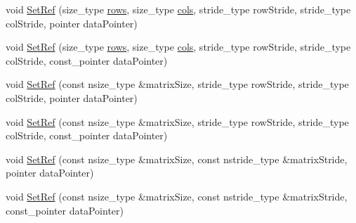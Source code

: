 {\bf }\par
\begin{DoxyCompactItemize}
\item 
void \hyperlink{classvct_dynamic_const_matrix_ref_a5f4c43a9600e4cf979d3daf0a466443a}{Set\-Ref} (size\-\_\-type \hyperlink{classvct_dynamic_const_matrix_base_a5eac13be2207ebeb8766cde379d73438}{rows}, size\-\_\-type \hyperlink{classvct_dynamic_const_matrix_base_aa6c51d41a100da49a7e7ac7edb20ecd9}{cols}, stride\-\_\-type row\-Stride, stride\-\_\-type col\-Stride, pointer data\-Pointer)
\item 
void \hyperlink{classvct_dynamic_const_matrix_ref_ac5ecb9f96a3cfc67d87ca1c7ddd0ed43}{Set\-Ref} (size\-\_\-type \hyperlink{classvct_dynamic_const_matrix_base_a5eac13be2207ebeb8766cde379d73438}{rows}, size\-\_\-type \hyperlink{classvct_dynamic_const_matrix_base_aa6c51d41a100da49a7e7ac7edb20ecd9}{cols}, stride\-\_\-type row\-Stride, stride\-\_\-type col\-Stride, const\-\_\-pointer data\-Pointer)
\item 
void \hyperlink{classvct_dynamic_const_matrix_ref_a18b9973b97e37a3265dcc62cc957bd25}{Set\-Ref} (const nsize\-\_\-type \&matrix\-Size, stride\-\_\-type row\-Stride, stride\-\_\-type col\-Stride, pointer data\-Pointer)
\item 
void \hyperlink{classvct_dynamic_const_matrix_ref_aa7fa0f5ba9ad1ac2520a575ddc965530}{Set\-Ref} (const nsize\-\_\-type \&matrix\-Size, stride\-\_\-type row\-Stride, stride\-\_\-type col\-Stride, const\-\_\-pointer data\-Pointer)
\item 
void \hyperlink{classvct_dynamic_const_matrix_ref_a9d48b0ba4d9f00620e32f3bfb8095722}{Set\-Ref} (const nsize\-\_\-type \&matrix\-Size, const nstride\-\_\-type \&matrix\-Stride, pointer data\-Pointer)
\item 
void \hyperlink{classvct_dynamic_const_matrix_ref_a96ceb12bed491ac0d133bca0d50cc897}{Set\-Ref} (const nsize\-\_\-type \&matrix\-Size, const nstride\-\_\-type \&matrix\-Stride, const\-\_\-pointer data\-Pointer)
\end{DoxyCompactItemize}

